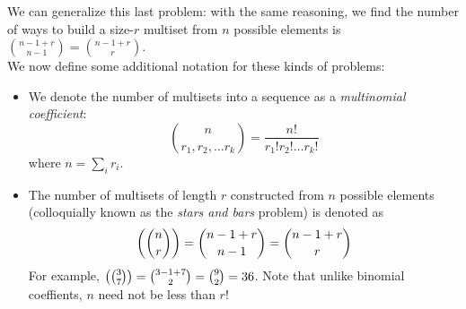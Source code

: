 \newline
We can generalize this last problem: with the same reasoning, we find the number of ways to build a size-$r$ multiset from $n$ possible elements is $\binom{n-1+r}{n-1} = \binom{n-1+r}{r}$. \\
We now define some additional notation for these kinds of problems: 
\begin{itemize}
\item We denote the number of multisets into a sequence as a \textit{multinomial coefficient}:
\[
	\binom{n}{r_1, r_2, \ldots r_k} = \frac{n!}{r_1! r_2! \ldots r_k!}
\]
where $n = \sum_i r_i$. 
\item The number of multisets of length $r$ constructed from $n$ possible elements (colloquially known as the \textit{stars and bars} problem) is denoted as 
\[
	\left(\binom{n}{r}\right) = \binom{n-1+r}{n-1} = \binom{n-1+r}{r}
\]
For example, $\left(\binom{3}{7}\right) = \binom{3-1+7}{2} = \binom{9}{2} = 36$. Note that unlike binomial coeffients, $n$ need not be less than $r$! 
\end{itemize}






% 
